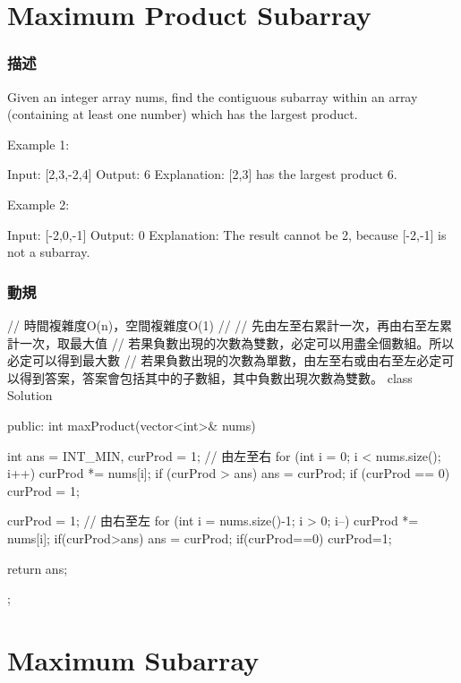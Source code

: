 \section{Maximum Product Subarray} %
\label{sec:maximum-product-subarray}


\subsubsection{描述}
Given an integer array nums, find the contiguous subarray within an array (containing at least one number) which has the largest product.

Example 1:
\begin{Code}
Input: [2,3,-2,4]
Output: 6
Explanation: [2,3] has the largest product 6.
\end{Code}

Example 2:
\begin{Code}
Input: [-2,0,-1]
Output: 0
Explanation: The result cannot be 2, because [-2,-1] is not a subarray.
\end{Code}

\subsubsection{動規}
\begin{Code}
// 時間複雜度O(n)，空間複雜度O(1)
//
// 先由左至右累計一次，再由右至左累計一次，取最大值
// 若果負數出現的次數為雙數，必定可以用盡全個數組。所以必定可以得到最大數
// 若果負數出現的次數為單數，由左至右或由右至左必定可以得到答案，答案會包括其中的子數組，其中負數出現次數為雙數。
class Solution {
public:
    int maxProduct(vector<int>& nums) {
        int ans = INT_MIN, curProd = 1;
        // 由左至右
        for (int i = 0; i < nums.size(); i++)
        {
            curProd *= nums[i];
            if (curProd > ans) ans = curProd;
            if (curProd == 0) curProd = 1;
        }

        curProd = 1;
        // 由右至左
        for (int i = nums.size()-1; i > 0; i--)
        {
            curProd *= nums[i];
            if(curProd>ans)  ans = curProd;
            if(curProd==0) curProd=1;
        }

        return ans;
    }
};
\end{Code}


\section{Maximum Subarray} %
\label{sec:maximum-subarray}


